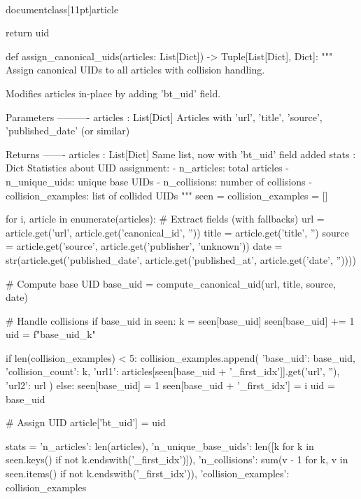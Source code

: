 \\documentclass[11pt]{article}
\begin{document}
\begin{CodeBlock}
    return uid


def assign_canonical_uids(articles: List[Dict]) -> Tuple[List[Dict], Dict]:
    """
    Assign canonical UIDs to all articles with collision handling.
    
    Modifies articles in-place by adding 'bt_uid' field.
    
    Parameters
    ----------
    articles : List[Dict]
        Articles with 'url', 'title', 'source', 'published_date' (or similar)
    
    Returns
    -------
    articles : List[Dict]
        Same list, now with 'bt_uid' field added
    stats : Dict
        Statistics about UID assignment:
        - n_articles: total articles
        - n_unique_uids: unique base UIDs
        - n_collisions: number of collisions
        - collision_examples: list of collided UIDs
    """
    seen = {}
    collision_examples = []
    
    for i, article in enumerate(articles):
        # Extract fields (with fallbacks)
        url = article.get('url', article.get('canonical_id', ''))
        title = article.get('title', '')
        source = article.get('source', article.get('publisher', 'unknown'))
        date = str(article.get('published_date', article.get('published_at', article.get('date', ''))))
        
        # Compute base UID
        base_uid = compute_canonical_uid(url, title, source, date)
        
        # Handle collisions
        if base_uid in seen:
            k = seen[base_uid]
            seen[base_uid] += 1
            uid = f"{base_uid}_{k}"
            
            if len(collision_examples) < 5:
                collision_examples.append({
                    'base_uid': base_uid,
                    'collision_count': k,
                    'url1': articles[seen[base_uid + '_first_idx']].get('url', ''),
                    'url2': url
                })
        else:
            seen[base_uid] = 1
            seen[base_uid + '_first_idx'] = i
            uid = base_uid
        
        # Assign UID
        article['bt_uid'] = uid
    
    stats = {
        'n_articles': len(articles),
        'n_unique_base_uids': len([k for k in seen.keys() if not k.endswith('_first_idx')]),
        'n_collisions': sum(v - 1 for k, v in seen.items() if not k.endswith('_first_idx')),
        'collision_examples': collision_examples
    }
    

\end{CodeBlock}
\end{document}
